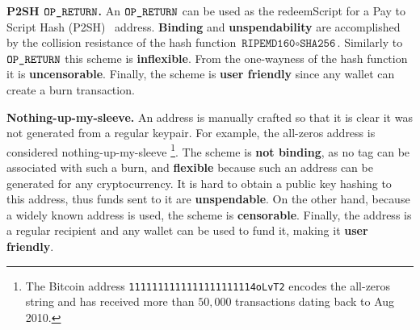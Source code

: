 \noindent
\textbf{P2SH $\texttt{OP\_RETURN}$.}
An $\texttt{OP\_RETURN}$ can be used as the redeemScript for a Pay to Script Hash (P2SH)~\cite{p2sh} address.
\textbf{Binding} and \textbf{unspendability} are accomplished by the collision resistance of the hash function $\texttt{RIPEMD160} \circ \texttt{SHA256}$.
Similarly to $\texttt{OP\_RETURN}$ this scheme is \textbf{inflexible}.
From the one-wayness of the hash function it is \textbf{uncensorable}.
Finally, the scheme is \textbf{user friendly} since any wallet can create a burn transaction.

\noindent
\textbf{Nothing-up-my-sleeve.}
An address is manually crafted so that it is clear it was not generated from a regular keypair.
For example, the all-zeros address is considered nothing-up-my-sleeve
\footnote{The Bitcoin address \texttt{1111111111111111111114oLvT2} encodes the all-zeros string and has received more than $50{,}000$ transactions dating back to Aug 2010.}.
The scheme is \textbf{not binding}, as no tag can be associated with such a burn, and \textbf{flexible} because such an address can be generated for any cryptocurrency.
It is hard to obtain a public key hashing to this address, thus funds sent to it are \textbf{unspendable}.
On the other hand, because a widely known address is used, the scheme is \textbf{censorable}.
Finally, the address is a regular recipient and any wallet can be used to fund it, making it \textbf{user friendly}.